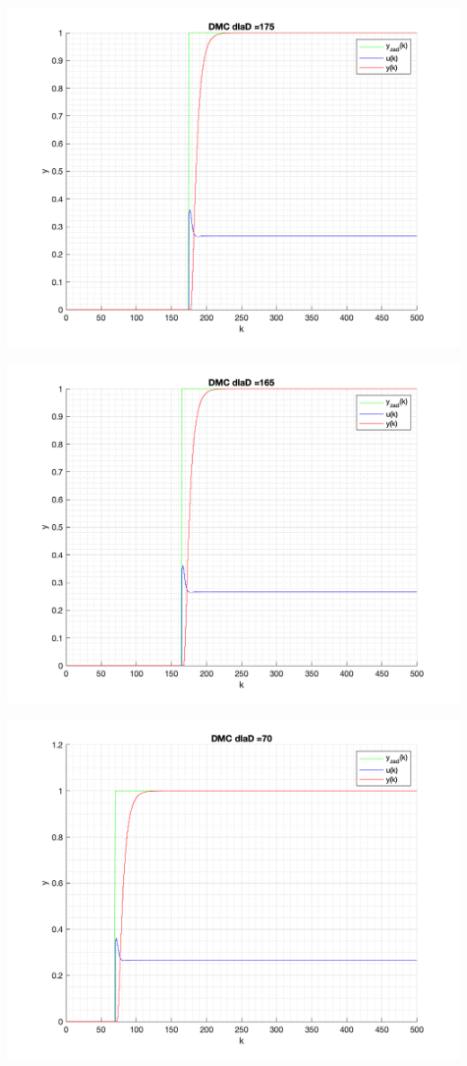 \documentclass[a4paper, 11pt]{article}
\begin{document}
\begin{enumerate}
 \includegraphics[width=\linewidth]{./ModelsP4_D/P4_DMC_D_175_png.png} 
 
 \includegraphics[width=\linewidth]{./ModelsP4_D/P4_DMC_D_165_png.png} 
 
 \includegraphics[width=\linewidth]{./ModelsP4_D/P4_DMC_D_70_png.png} 
 

\end{enumerate}
\end{document}
